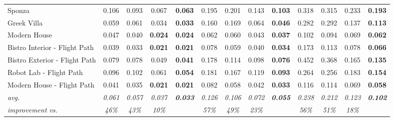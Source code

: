 \begin{table*}[t]
\begin{tabular}{l cccc|cccc|cccc}
Sponza                        & 0.106          & 0.093                  & 0.067                   & \textbf{0.063}          & 0.195          & 0.201                  & 0.143                   & \textbf{0.103}          & 0.318          & 0.315                  & 0.233                   & \textbf{0.193}          \\
Greek Villa                   & 0.059          & 0.061                  & 0.034                   & \textbf{0.033}          & 0.160          & 0.169                  & 0.064                   & \textbf{0.046}          & 0.282          & 0.292                  & 0.137                   & \textbf{0.113}          \\
Modern House                  & 0.047          & 0.040                  & \textbf{0.024}          & \textbf{0.024}          & 0.062          & 0.060                  & 0.043                   & \textbf{0.037}          & 0.102          & 0.094                  & 0.069                   & \textbf{0.062}          \\
Bistro Interior - Flight Path & 0.039          & 0.033                  & \textbf{0.021}          & \textbf{0.021}          & 0.078          & 0.059                  & 0.040                   & \textbf{0.034}          & 0.173          & 0.113                  & 0.078                   & \textbf{0.066}          \\
Bistro Exterior - Flight Path & 0.079          & 0.078                  & 0.049                   & \textbf{0.041}          & 0.178          & 0.114                  & 0.098                   & \textbf{0.076}          & 0.452          & 0.368                  & 0.165                   & \textbf{0.135}          \\
Robot Lab - Flight Path       & 0.096          & 0.102                  & 0.061                   & \textbf{0.054}          & 0.181          & 0.167                  & 0.119                   & \textbf{0.093}          & 0.264          & 0.256                  & 0.183                   & \textbf{0.154}          \\
Modern House - Flight Path    & 0.041          & 0.035                  & \textbf{0.021}          & \textbf{0.021}          & 0.082          & 0.058                  & 0.042                   & \textbf{0.033}          & 0.116          & 0.114                  & 0.069                   & \textbf{0.058}          \\
\hline
\textit{avg.}                 & \textit{0.061} & \textit{0.057}         & \textit{0.037}          & \textit{\textbf{0.033}} & \textit{0.126} & \textit{0.106}         & \textit{0.072}          & \textit{\textbf{0.055}} & \textit{0.238} & \textit{0.212}         & \textit{0.123}          & \textit{\textbf{0.102}} \\
\textit{improvement vs.}      & \textit{46\%}  & \textit{43\%}          & \textit{10\%}           &                         & \textit{57\%}  & \textit{49\%}          & \textit{23\%}           &                         & \textit{56\%}  & \textit{51\%}          & \textit{18\%}           &                        
\end{tabular}


\end{table*}
